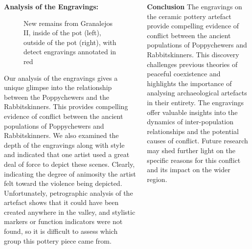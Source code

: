 \documentclass[final]{beamer}
\begin{document}
\begin{frame}[t]
\begin{columns}[t]
\begin{block}{\textbf{Analysis of the Engravings:}}
            \vspace{1cm}
            \begin{figure}
                \label{fig:twomaps}
                \centering
                \caption{New remains from Granalejos II, inside of the pot (left), outside of the pot (right), with detect engravings annotated in red}
            \end{figure}
            \vspace{1cm}



            Our analysis of the engravings gives a unique glimpse into the relationship between the Poppychewers and the Rabbitskinners. This provides compelling evidence of conflict between the ancient populations of Poppychewers and Rabbitskinners. We also examined the depth of the engravings along with style and indicated that one artist used a great deal of force to depict these scenes. Clearly, indicating the degree of animosity the artist felt toward the violence being depicted. Unfortunately, petrographic analysis of the artefact shows that it could have been created anywhere in the valley, and stylistic markers or function indicators were not found, so it is difficult to assess which group this pottery piece came from.

        \end{block}

    \begin{block}{\textbf{Conclusion}}
        The engravings on the ceramic pottery artefact provide compelling evidence of conflict between the ancient populations of Poppychewers and Rabbitskinners. This discovery challenges previous theories of peaceful coexistence and highlights the importance of analysing archaeological artefacts in their entirety. The engravings offer valuable insights into the dynamics of inter-population relationships and the potential causes of conflict. Future research may shed further light on the specific reasons for this conflict and its impact on the wider region.
        \end{block}


\end{columns}
\end{frame}
\end{document}
